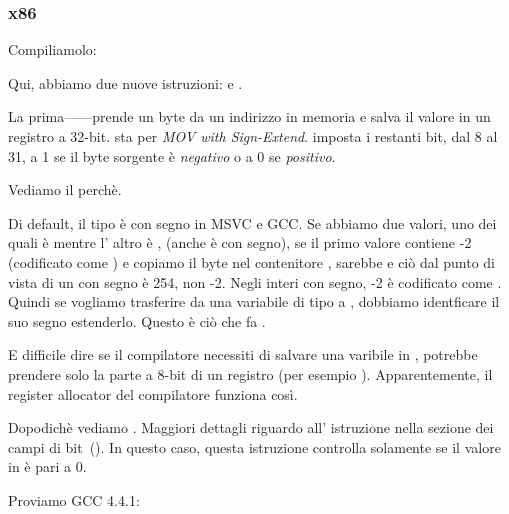\subsubsection{x86}


Compiliamolo:




Qui, abbiamo due nuove istruzioni: \MOVSX e \TEST.

\label{MOVSX}

La prima---\MOVSX---prende un byte da un indirizzo in memoria e salva il valore in un registro a 32-bit. 
\MOVSX sta per \emph{MOV with Sign-Extend}. 
\MOVSX imposta i restanti bit, dal 8 al 31, 
a 1 se il byte sorgente è \emph{negativo} o a 0 se \emph{positivo}.

Vediamo il perchè.

Di default, il tipo \Tchar è con segno in MSVC e GCC. Se abbiamo due valori, uno dei quali è \Tchar 
mentre l' altro è \Tint, (anche \Tint è con segno), se il primo valore contiene -2 (codificato come ) 
e copiamo il byte nel contenitore \Tint, sarebbe  e ciò 
dal punto di vista di un \Tint con segno è 254, non -2. Negli interi con segno, -2 è codificato come . 
Quindi se vogliamo trasferire  da una variabile di tipo \Tchar a \Tint, 
dobbiamo identficare il suo segno estenderlo. Questo è ciò che fa \MOVSX.

E difficile dire se il compilatore necessiti di salvare una varibile \Tchar in \EDX, potrebbe prendere solo la parte a 8-bit di un registro 
(per esempio \DL). Apparentemente, il \gls{register allocator} del compilatore funziona così.


Dopodichè vediamo . 
Maggiori dettagli riguardo all' istruzione \TEST nella sezione dei campi di bit~().
In questo caso, questa istruzione controlla solamente se il valore in \EDX è pari a 0.


Proviamo GCC 4.4.1:



\label{movzx}


